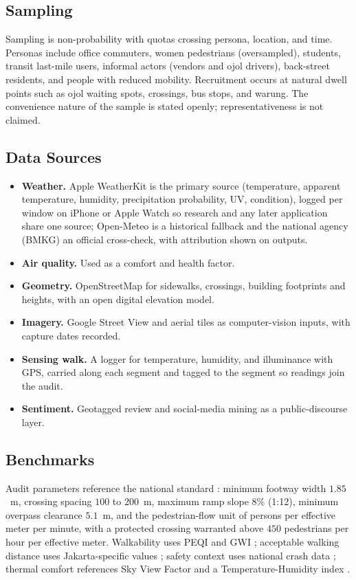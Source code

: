 \documentclass[conference]{IEEEtran}
\begin{document}
\subsection{Sampling}
Sampling is non-probability with quotas crossing persona, location, and time. Personas include
office commuters, women pedestrians (oversampled), students, transit last-mile users, informal
actors (vendors and ojol drivers), back-street residents, and people with reduced mobility.
Recruitment occurs at natural dwell points such as ojol waiting spots, crossings, bus stops, and
warung. The convenience nature of the sample is stated openly; representativeness is not claimed.

\subsection{Data Sources}
\begin{itemize}
  \item \textbf{Weather.} Apple WeatherKit is the primary source (temperature, apparent
        temperature, humidity, precipitation probability, UV, condition), logged per window on
        iPhone or Apple Watch so research and any later application share one source; Open-Meteo is
        a historical fallback and the national agency (BMKG) an official cross-check, with
        attribution shown on outputs.
  \item \textbf{Air quality.} Used as a comfort and health factor.
  \item \textbf{Geometry.} OpenStreetMap for sidewalks, crossings, building footprints and heights,
        with an open digital elevation model.
  \item \textbf{Imagery.} Google Street View and aerial tiles as computer-vision inputs, with
        capture dates recorded.
  \item \textbf{Sensing walk.} A logger for temperature, humidity, and illuminance with GPS,
        carried along each segment and tagged to the segment so readings join the audit.
  \item \textbf{Sentiment.} Geotagged review and social-media mining as a public-discourse layer.
\end{itemize}

\subsection{Benchmarks}
Audit parameters reference the national standard \autocite{binamarga2023}: minimum footway width
$1.85$~m, crossing spacing $100$ to $200$~m, maximum ramp slope $8\%$ (1:12), minimum overpass
clearance $5.1$~m, and the pedestrian-flow unit of persons per effective meter per minute, with a
protected crossing warranted above $450$ pedestrians per hour per effective meter. Walkability uses
PEQI and GWI \autocite{dwisadana2024,mulyadi2022}; acceptable walking distance uses Jakarta-specific
values \autocite{afkara2020walking}; safety context uses national crash data
\autocite{korlantas2023}; thermal comfort references Sky View Factor and a Temperature-Humidity
index \autocite{arif2021skyview}.
\end{document}
